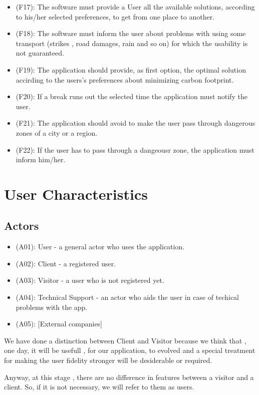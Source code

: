 \documentclass[a4paper,leqno]{book}
\begin{document}
\begin{itemize}
	\item (F17): The software must provide a User all the available solutions, according to his/her selected preferences, to get from one place to another.
	\item (F18): The software must inform the user about problems with using some transport (strikes , road damages, rain and so on) for which the usability is not guaranteed.
	\item (F19): The application should provide, as first option, the optimal solution accirding to the users's preferences about minimizing carbon footprint.
	\item (F20): If a break runs out the selected time the application must notify the user.
	\item (F21): The application should avoid to make the user pass through dangerous zones of a city or a region.
	\item (F22): If the user has to pass through a dangeousr zone, the application must inform him/her.
\end{itemize}

\section{User Characteristics}
\subsection{Actors}
\begin{itemize}
	\item (A01): User - a general actor who uses the application.
		\item (A02): Client - a registered user.
		\item (A03): Visitor - a user who is not registered yet.
	\item (A04): Technical Support - an actor who aids the user in case of techical problems with the app.
	\item (A05): [External companies]
\end{itemize}

We have done a distinction between Client and Visitor because we think that , one day, 
it will be usefull , for our application, to evolved and a special treatment for making the 
user fidelity stronger will be desiderable or required.

Anyway, at this stage , there are no difference in features between a visitor and a client. 
So, if it is not necessary, we will refer to them as users.
\end{document}
